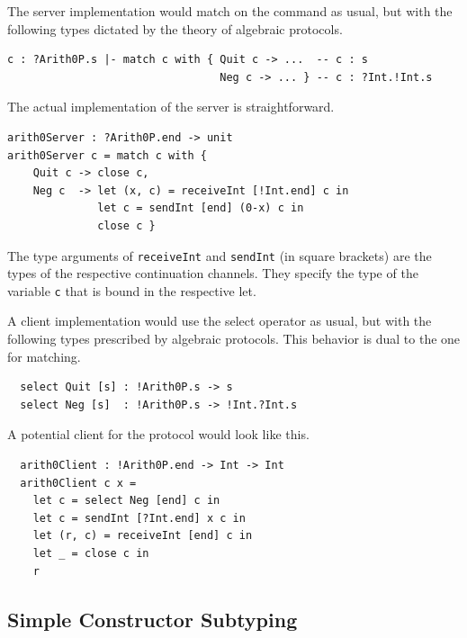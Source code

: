 The server implementation would match on the command as usual, but
with the following types dictated by the theory of algebraic
protocols.
\begin{lstlisting}
c : ?Arith0P.s |- match c with { Quit c -> ...  -- c : s
                                 Neg c -> ... } -- c : ?Int.!Int.s
\end{lstlisting}
The actual implementation of the server is straightforward.
\begin{lstlisting}
arith0Server : ?Arith0P.end -> unit
arith0Server c = match c with {
    Quit c -> close c,
    Neg c  -> let (x, c) = receiveInt [!Int.end] c in
              let c = sendInt [end] (0-x) c in
              close c }
\end{lstlisting}
The type arguments of \lstinline+receiveInt+ and \lstinline+sendInt+
(in square brackets)
are the types of the respective continuation channels. They specify
the type of the variable \lstinline+c+ that is bound in the respective
let.


A client implementation would use the select operator as usual, but
with the following types prescribed by algebraic protocols. This
behavior is dual to the one for matching.

\begin{lstlisting}
  select Quit [s] : !Arith0P.s -> s
  select Neg [s]  : !Arith0P.s -> !Int.?Int.s
\end{lstlisting}

A potential client for the protocol would look like this.
\begin{lstlisting}
  arith0Client : !Arith0P.end -> Int -> Int
  arith0Client c x =
    let c = select Neg [end] c in
    let c = sendInt [?Int.end] x c in
    let (r, c) = receiveInt [end] c in
    let _ = close c in
    r
\end{lstlisting}

\subsection{Simple Constructor Subtyping}
\label{sec:simple-constr-subtyp}

